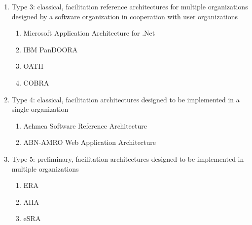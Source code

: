 \documentclass{bmcart}
\begin{document}
    \begin{enumerate}
        \item Type 3: classical, facilitation reference architectures for multiple organizations designed by a software organization in cooperation with user organizations
        \begin{enumerate}
            \item Microsoft Application Architecture for .Net  \cite{microsoft2002application}
            \item IBM PanDOORA
            \item OATH \cite{OATH}
            \item COBRA \cite{pope1998corba}
        \end{enumerate}

        \item Type 4: classical, facilitation architectures designed to be implemented in a single organization
        \begin{enumerate}
            \item Achmea Software Reference Architecture   \cite{greefhorst2006achmea}
            \item ABN-AMRO Web Application Architecture \cite{greefhorst1999een}
        \end{enumerate}

        \item Type 5: preliminary, facilitation architectures designed to be implemented in multiple organizations
        \begin{enumerate}
            \item ERA   \cite{angelov2008contracting}
            \item AHA   \cite{wu2002reference}
            \item eSRA  \cite{norta2007exploring}
        \end{enumerate}

    \end{enumerate}


\end{document}
